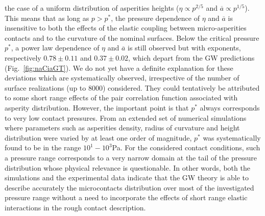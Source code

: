 \documentclass[pre,groupedaddress,showkeys,showpacs,twocolumn]{revtex4}
\begin{document}
the case of a uniform distribution of asperities heights ($\eta \propto p^{2/5}$ and $\overline{a} \propto p^{1/5}$). This means that as long as $p>p^*$, the pressure dependence of $\eta$ and $\overline{a}$ is insensitive to both the effects of the elastic coupling between micro-asperities contacts and to the curvature of the nominal surfaces. Below the critical pressure $p^*$, a power law dependence of $\eta$ and $\overline{a}$ is still observed but with exponents, respectively  $0.78 \pm 0.11$ and $0.37 \pm 0.02$, which depart from the GW predictions (Fig.~\ref{fig:naCiaGT}). We do not yet have a definite explanation for these deviations which are systematically observed, irrespective of the number of surface realizations (up to 8000) considered. They could tentatively be attributed to some short range effects of the pair correlation function associated with asperity distribution. However, the important point is that $p^*$ always corresponds to very low contact pressures. From an extended set of numerical 
simulations where parameters such as asperities density, radius of curvature and height distribution were varied by at least one order of magnitude, $p^*$ was systematically found to be in the range $10^1-10^3$Pa. For the considered contact conditions, such a pressure range corresponds to a very narrow domain at the tail of the pressure distribution whose physical relevance is questionable. In other words, both the simulations and the experimental data indicate that the GW theory is able to describe accurately the microcontacts distribution over most of the investigated pressure range without a need to incorporate the effects of short range elastic interactions in the rough contact description.
%
\end{document}
